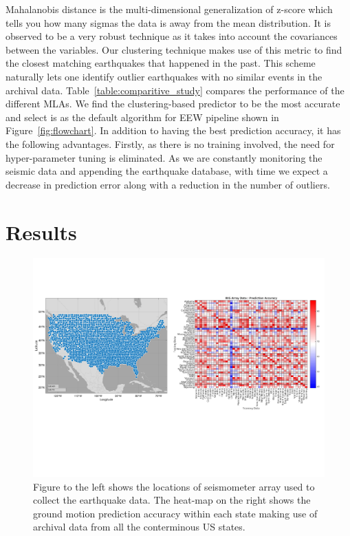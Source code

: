 \documentclass[twocolumn, aps, superscriptaddress]{revtex4}
\begin{document}
Mahalanobis distance is the multi-dimensional generalization of z-score which tells you how many sigmas the data is away from the mean distribution. It is observed to be a very robust technique as it takes into account the covariances between the variables. Our clustering technique makes use of this metric to find the closest matching earthquakes that happened in the past. This scheme naturally lets one identify outlier earthquakes with no similar events in the archival data. Table~\ref{table:comparitive_study} compares the performance of the different MLAs. We find the clustering-based predictor to be the most accurate and select is as the default algorithm  for EEW pipeline shown in Figure~\ref{fig:flowchart}. In addition to having the best prediction accuracy, it has the following advantages.  Firstly, as there is no training involved, the need for hyper-parameter tuning is eliminated. As we are constantly monitoring the seismic data and appending the earthquake database, with time we expect a decrease in prediction error along with a reduction in the number of outliers.  

\section{Results}\label{sec:results}

\begin{figure}[!htb]
 \includegraphics[width=\textwidth]{./plots/USArray_with_HeatMap}
 \caption{Figure to the left shows the locations of seismometer array used to collect the earthquake data. The heat-map on the right shows the ground motion prediction accuracy within each state making use of archival data from all the conterminous US states.}
 \label{fig:map}
\end{figure}
\end{document}
